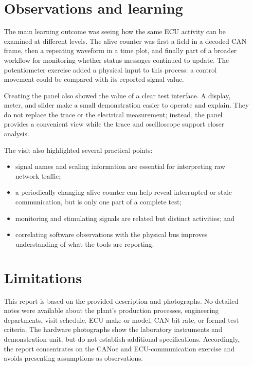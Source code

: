 \documentclass[12pt,a4paper]{article}
\begin{document}
\section{Observations and learning}

The main learning outcome was seeing how the same ECU activity can be examined at different levels. The alive counter was first a field in a decoded CAN frame, then a repeating waveform in a time plot, and finally part of a broader workflow for monitoring whether status messages continued to update. The potentiometer exercise added a physical input to this process: a control movement could be compared with its reported signal value.

Creating the panel also showed the value of a clear test interface. A display, meter, and slider make a small demonstration easier to operate and explain. They do not replace the trace or the electrical measurement; instead, the panel provides a convenient view while the trace and oscilloscope support closer analysis.

The visit also highlighted several practical points:
\begin{itemize}
    \item signal names and scaling information are essential for interpreting raw network traffic;
    \item a periodically changing alive counter can help reveal interrupted or stale communication, but is only one part of a complete test;
    \item monitoring and stimulating signals are related but distinct activities; and
    \item correlating software observations with the physical bus improves understanding of what the tools are reporting.
\end{itemize}

\section{Limitations}

This report is based on the provided description and photographs. No detailed notes were available about the plant's production processes, engineering departments, visit schedule, ECU make or model, CAN bit rate, or formal test criteria. The hardware photographs show the laboratory instruments and demonstration unit, but do not establish additional specifications. Accordingly, the report concentrates on the CANoe and ECU-communication exercise and avoids presenting assumptions as observations.
\end{document}

